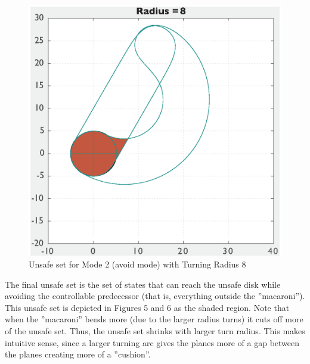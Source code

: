 \documentclass[a4paper]{article}
\begin{document}
\begin{figure}[!ht]
\begin{minipage}[b]{0.4\textwidth}
    \includegraphics[width=1.0\textwidth]{HyAvoid8over.eps}
    \caption{Unsafe set for Mode 2 (avoid mode) with Turning Radius 8}
  \end{minipage}
\end{figure}

The final unsafe set is the set of states that can reach the unsafe disk while avoiding the controllable predecessor (that is, everything outside the ''macaroni'').
This unsafe set is depicted in Figures 5 and 6 as the shaded region.
Note that when the ''macaroni'' bends more (due to the larger radius turns) it cuts off more of the unsafe set.
Thus, the unsafe set shrinks with larger turn radius.
This makes intuitive sense, since a larger turning arc gives the planes more of a gap between the planes creating more of a ''cushion''.
\end{document}
